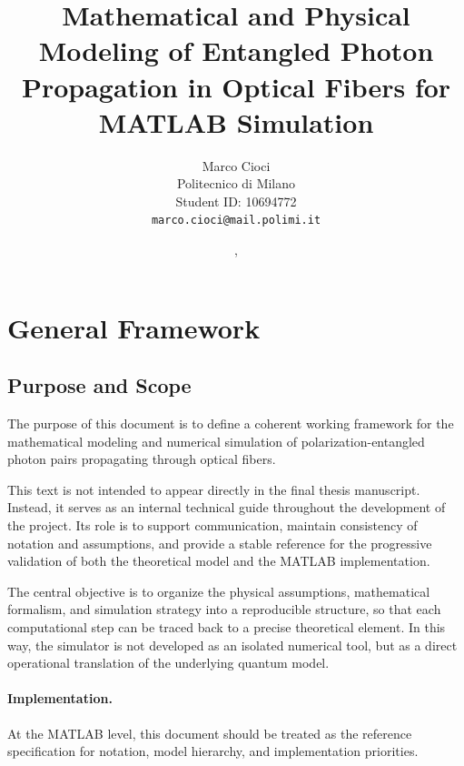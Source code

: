 \documentclass[a4paper]{article}
\title{
Mathematical and Physical Modeling of Entangled Photon Propagation in Optical Fibers for MATLAB Simulation
}
\author{
Marco Cioci\\
Politecnico di Milano\\
Student ID: 10694772\\
\texttt{marco.cioci@mail.polimi.it}
}
\date{\DTMenglishmonthname{\the\month}, \the\year}
\begin{document}
\maketitle

\tableofcontents

\medskip



\newpage
\section{General Framework}


\subsection{Purpose and Scope}

The purpose of this document is to define a coherent working framework for the mathematical modeling and numerical simulation of polarization-entangled photon pairs propagating through optical fibers.

This text is not intended to appear directly in the final thesis manuscript. Instead, it serves as an internal technical guide throughout the development of the project. Its role is to support communication, maintain consistency of notation and assumptions, and provide a stable reference for the progressive validation of both the theoretical model and the MATLAB implementation.

\medskip

The central objective is to organize the physical assumptions, mathematical formalism, and simulation strategy into a reproducible structure, so that each computational step can be traced back to a precise theoretical element. In this way, the simulator is not developed as an isolated numerical tool, but as a direct operational translation of the underlying quantum model.

\medskip

\paragraph{Implementation.}

At the MATLAB level, this document should be treated as the reference specification for notation, model hierarchy, and implementation priorities.
\end{document}

